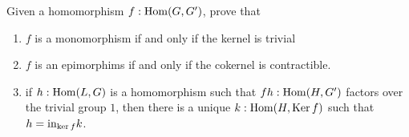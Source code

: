 \begin{xca}
  Given a homomorphism $f:\Hom(G,G')$, prove that
  \begin{enumerate}
  \item $f$ is a monomorphism if and only if the kernel is trivial
  \item $f$ is an epimorphims if and only if the cokernel is contractible.
  \item if $h:\Hom(L,G)$ is a homomorphism such that $fh:\Hom(H,G')$ factors over the trivial group $1$, then there is a unique $k:\Hom(H,\Ker f)$ such that $h=\incl_{\ker f}k$.
  \end{enumerate}
\end{xca}


